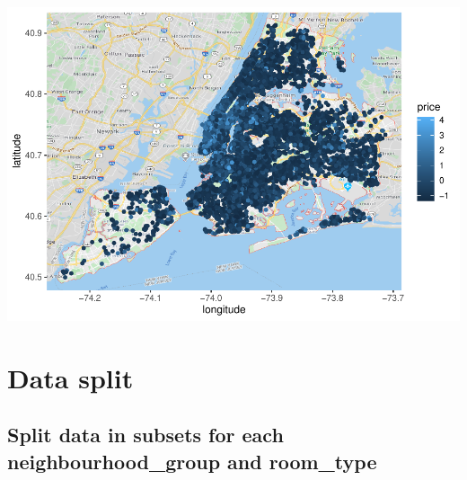 \documentclass[
]{article}
\begin{document}
\includegraphics{project-code_files/figure-latex/unnamed-chunk-8-1.pdf}

\hypertarget{data-split}{%
\section{Data split}\label{data-split}}

\hypertarget{split-data-in-subsets-for-each-neighbourhood_group-and-room_type}{%
\subsection{Split data in subsets for each neighbourhood\_group and
room\_type}\label{split-data-in-subsets-for-each-neighbourhood_group-and-room_type}}
\end{document}
